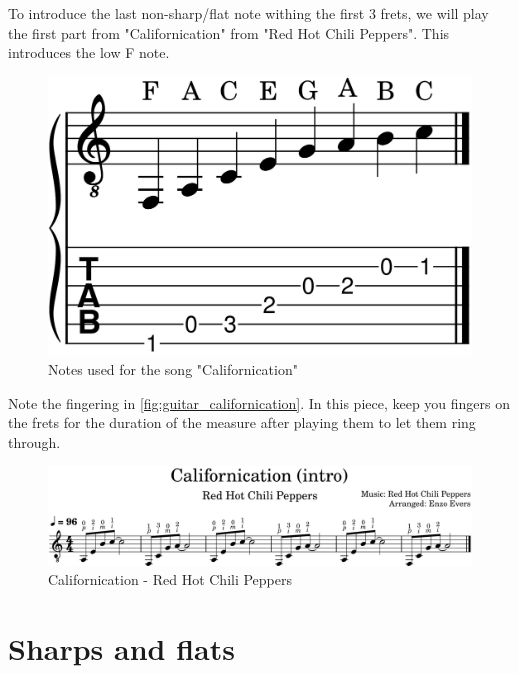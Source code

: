 To introduce the last non-sharp/flat note withing the first 3 frets, we will play the first part from "Californication" from "Red Hot Chili Peppers". This introduces the low F note.

\begin{figure}[h]
	\centering
	\includegraphics[height=0.12\textheight]{../../MuseScore/Guitar/GuitarNotesUsedInCalifornication.png}
	\caption{Notes used for the song "Californication"}
	\label{fig:guitar_notes_for_californication}
\end{figure}

Note the fingering in \autoref{fig:guitar_californication}. In this piece, keep you fingers on the frets for the duration of the measure after playing them to let them ring through.

\begin{figure}[h]
	\centering
	\includegraphics[width=\textwidth]{../../MuseScore/Guitar/GuitarCalifornicationRedHotChiliPeppers.png}
	\caption{Californication - Red Hot Chili Peppers}
	\label{fig:guitar_californication}
\end{figure}

\newpage

\section{Sharps and flats}

